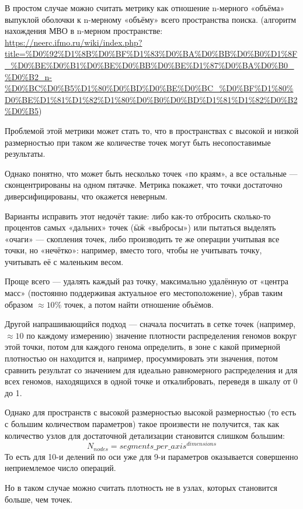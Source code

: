 В простом случае можно считать метрику как отношение n-мерного «объёма» выпуклой оболочки к n-мерному «объёму» всего пространства поиска.
(алгоритм нахождения МВО в n-мерном пространстве: \url{https://neerc.ifmo.ru/wiki/index.php?title=%D0%92%D1%8B%D0%BF%D1%83%D0%BA%D0%BB%D0%B0%D1%8F_%D0%BE%D0%B1%D0%BE%D0%BB%D0%BE%D1%87%D0%BA%D0%B0_%D0%B2_n-%D0%BC%D0%B5%D1%80%D0%BD%D0%BE%D0%BC_%D0%BF%D1%80%D0%BE%D1%81%D1%82%D1%80%D0%B0%D0%BD%D1%81%D1%82%D0%B2%D0%B5})

Проблемой этой метрики может стать то, что в пространствах с высокой и низкой  размерностью при таком же количестве точек могут быть несопоставимые результаты.

Однако понятно, что может быть несколько точек «по краям», а все остальные — сконцентрированы на одном пятачке.
Метрика покажет, что точки достаточно диверсифицированы, что окажется неверным.

Варианты исправить этот недочёт такие:
либо как-то отбросить сколько-то процентов самых «дальних» точек (ӹӝ «выбросы») или пытаться выделять «очаги» — скопления точек,
либо производить те же операции учитывая все точки, но «нечётко»: например, вместо того, чтобы не учитывать точку, учитывать её с маленьким весом.

Проще всего — удалять каждый раз точку, максимально удалённую от «центра масс» (постоянно поддерживая актуальное его местоположение),
убрав таким образом $\approx 10\%$ точек, а потом найти отношение объёмов.

Другой напрашивающийся подход — сначала посчитать в сетке точек (например, $\approx 10$ по каждому измерению)
значение плотности распределения геномов вокруг этой точки, потом для каждого генома определить, в зоне с какой примерной плотностью он находится и, например, просуммировать эти значения,
потом сравнить результат со значением для идеально равномерного распределения и для всех геномов, находящихся в одной точке и откалибровать, переведя в шкалу от 0 до 1.

Однако для пространств с высокой размерностью высокой размерностью (то есть с большим количеством параметров) такое произвести не получится, так как количество узлов
для достаточной детализации становится слишком большим:
\begin{equation}
    N_{nodes} = segments\_per\_axis^{dimensions}
\end{equation}
То есть для 10-и делений по оси уже для 9-и параметров оказывается совершенно неприемлемое число операций.

Но в таком случае можно считать плотность не в узлах, которых становится больше, чем точек.

